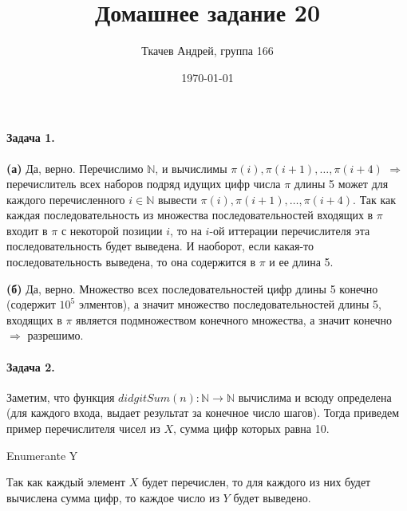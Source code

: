 \documentclass{article}
\title{Домашнее задание 20}
\author{Ткачев Андрей, группа 166}
\date{\today}
\newcommand{\N}{\mathbb{N}}
\begin{document}
    \maketitle
    \paragraph{Задача 1.}
    \textbf{(а)} Да, верно. Перечислимо $\N$, и вычислимы $\pi(i), \pi(i + 1), \ldots, \pi(i + 4)$ $\Rightarrow$ перечислитель всех наборов подряд идущих цифр числа $\pi$ длины 5 может для каждого перечисленного $i \in \N$ вывести $\pi(i), \pi(i + 1), \ldots, \pi(i + 4)$. Так как каждая последовательность из множества последовательностей входящих в $\pi$ входит в $\pi$ с некоторой позиции $i$, то на $i$-ой иттерации перечислителя эта последовательность будет выведена. И наоборот, если какая-то последовательность выведена, то она содержится в $\pi$ и ее длина 5.

     \textbf{(б)} Да, верно. Множество всех последовательностей цифр длины 5 конечно (содержит $10^5$ элментов), а значит множество последовательностей длины 5, входящих в $\pi$ является подмножеством конечного множества, а значит конечно $\Rightarrow$ разрешимо.

     \paragraph{Задача 2.} Заметим, что функция $didgitSum(n): \N \rightarrow \N$ вычислима и всюду определена (для каждого входа, выдает результат за конечное число шагов). Тогда приведем пример перечислителя чисел из $X$, сумма цифр которых равна 10.
     
     \begin{algorithm}[H]
        \SetAlgoLined %
        \caption{Enumerante Y}
    \end{algorithm}

    Так как каждый элемент $X$ будет перечислен, то для каждого из них будет вычислена сумма цифр, то каждое число из $Y$ будет выведено.
\end{document}
